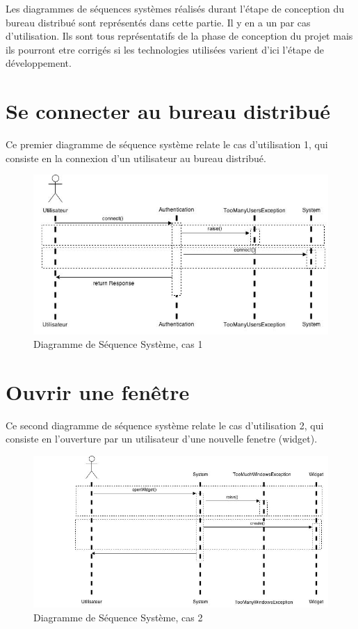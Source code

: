 Les diagrammes de séquences systèmes réalisés durant l'étape
de conception du bureau distribué sont représentés dans cette 
partie. Il y en a un par cas d'utilisation. 
Ils sont tous représentatifs de la phase de conception du projet
mais ils pourront etre corrigés si les technologies utilisées
varient d'ici l'étape de développement.

\section{Se connecter au bureau distribué}

Ce premier diagramme de séquence système relate le cas d'utilisation
1, qui consiste en la connexion d'un utilisateur au bureau distribué.

\begin{figure}[h!]
	\centering
	\includegraphics[scale=0.4]{diagrammes/DSS1.jpg}
	\caption{Diagramme de Séquence Système, cas 1}
\end{figure}

\section{Ouvrir une fenêtre}

Ce second diagramme de séquence système relate le cas d'utilisation
2, qui consiste en l'ouverture par un utilisateur d'une nouvelle 
fenetre (widget).

\begin{figure}[h!]
	\centering
	\includegraphics[scale=0.4]{diagrammes/DSS2.jpg}
	\caption{Diagramme de Séquence Système, cas 2}
\end{figure}
\newpage
